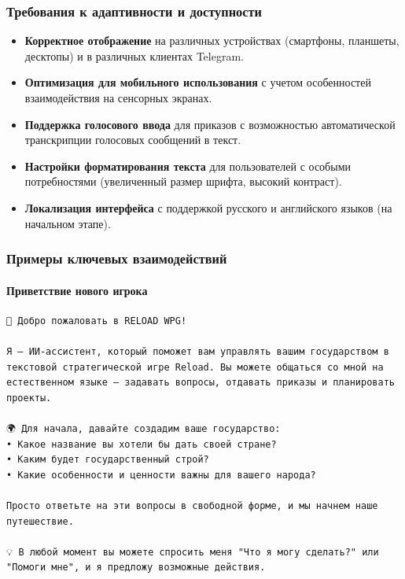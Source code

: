 \subsubsection{Требования к адаптивности и доступности}

\begin{itemize}
    \item \textbf{Корректное отображение} на различных устройствах (смартфоны, планшеты, десктопы) и в различных клиентах Telegram.

    \item \textbf{Оптимизация для мобильного использования} с учетом особенностей взаимодействия на сенсорных экранах.

    \item \textbf{Поддержка голосового ввода} для приказов с возможностью автоматической транскрипции голосовых сообщений в текст.

    \item \textbf{Настройки форматирования текста} для пользователей с особыми потребностями (увеличенный размер шрифта, высокий контраст).

    \item \textbf{Локализация интерфейса} с поддержкой русского и английского языков (на начальном этапе).
\end{itemize}

\subsubsection{Примеры ключевых взаимодействий}

\paragraph{Приветствие нового игрока}

\begin{verbatim}
👋 Добро пожаловать в RELOAD WPG!

Я — ИИ-ассистент, который поможет вам управлять вашим государством в
текстовой стратегической игре Reload. Вы можете общаться со мной на
естественном языке — задавать вопросы, отдавать приказы и планировать проекты.

🌍 Для начала, давайте создадим ваше государство:
• Какое название вы хотели бы дать своей стране?
• Каким будет государственный строй?
• Какие особенности и ценности важны для вашего народа?

Просто ответьте на эти вопросы в свободной форме, и мы начнем наше путешествие.

💡 В любой момент вы можете спросить меня "Что я могу сделать?" или
"Помоги мне", и я предложу возможные действия.
\end{verbatim}

